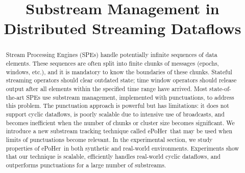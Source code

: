\documentclass[sigconf]{acmart}
\newcommand {\tracker} {ePoHer}
\begin{document}
\title {Substream Management in Distributed Streaming Dataflows}



\begin{abstract}
Stream Processing Engines (SPEs) handle potentially infinite sequences of data elements. These sequences are often split into finite chunks of messages (epochs, windows, etc.), and it is mandatory to know the boundaries of these chunks. Stateful streaming operators should clear outdated state; time window operators should release output after all elements within the specified time range have arrived. Most state-of-the-art SPEs use substream management, implemented with punctuations, to address this problem. The punctuation approach is powerful but has limitations: it does not support cyclic dataflows, is poorly scalable due to intensive use of broadcasts, and becomes inefficient when the number of chunks or cluster size becomes significant. We introduce a new substream tracking technique called \tracker\ that may be used when limits of punctuations become relevant. In the experimental section, we study properties of \tracker\ in both synthetic and real-world environments. Experiments show that our technique is scalable, efficiently handles real-world cyclic dataflows, and outperforms punctuations for a large number of substreams.
\end{abstract}
\end{document}
